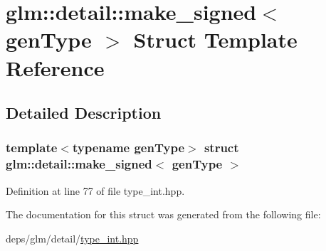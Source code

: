 \hypertarget{structglm_1_1detail_1_1make__signed}{}\section{glm\+:\+:detail\+:\+:make\+\_\+signed$<$ gen\+Type $>$ Struct Template Reference}
\label{structglm_1_1detail_1_1make__signed}


\subsection{Detailed Description}
\subsubsection*{template$<$typename gen\+Type$>$\newline
struct glm\+::detail\+::make\+\_\+signed$<$ gen\+Type $>$}



Definition at line 77 of file type\+\_\+int.\+hpp.



The documentation for this struct was generated from the following file\+:\begin{DoxyCompactItemize}
\item 
deps/glm/detail/\hyperlink{type__int_8hpp}{type\+\_\+int.\+hpp}\end{DoxyCompactItemize}
